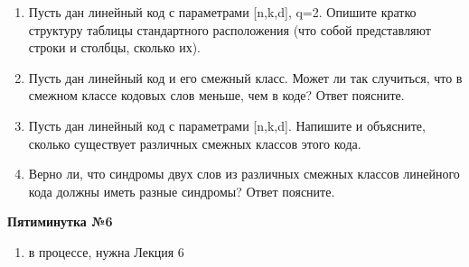 \documentclass[a4paper, 12pt]{report}
\begin{document}
\begin{enumerate}

\item Пусть дан линейный код с параметрами [n,k,d], q=2. Опишите кратко структуру таблицы стандартного расположения (что собой представляют строки и столбцы, сколько их).

\item Пусть дан линейный код и его смежный класс. Может ли так случиться, что в смежном классе кодовых слов меньше, чем в коде? Ответ поясните.

\item Пусть дан линейный код с параметрами [n,k,d]. Напишите и объясните, сколько существует различных смежных классов этого кода.

\item Верно ли, что синдромы двух слов из различных смежных классов линейного кода должны иметь разные синдромы? Ответ поясните.

\end{enumerate}


\textbf{Пятиминутка №6}

\begin{enumerate}
 
\item в процессе, нужна Лекция 6 
 
\end{enumerate}
\end{document}

